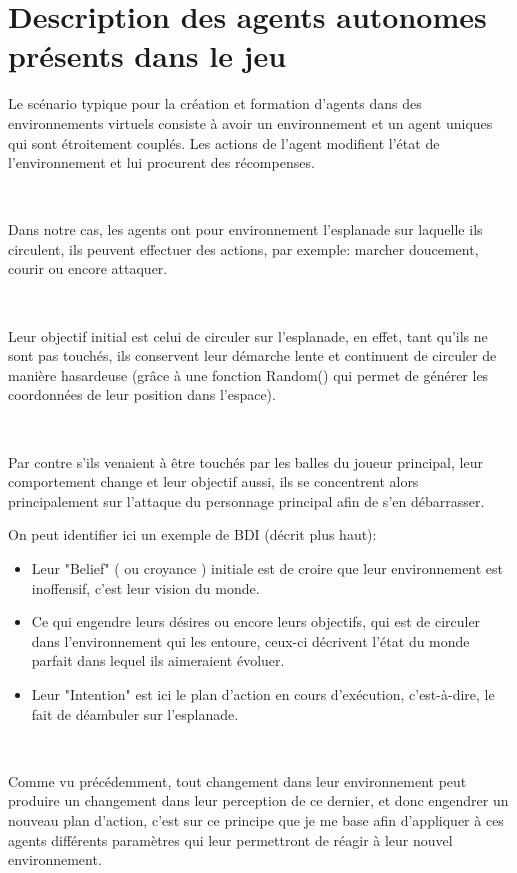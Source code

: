 \section{Description des agents autonomes présents dans le jeu}

Le scénario typique pour la création et formation d’agents dans des environnements virtuels consiste à avoir un environnement et un agent uniques qui sont étroitement couplés. Les actions de l'agent modifient l'état de l'environnement et lui procurent des récompenses. \parencite{unity2}  

~\par
Dans notre cas, les agents ont pour environnement l’esplanade sur laquelle ils circulent, ils peuvent effectuer des actions, par exemple:  marcher doucement, courir ou encore attaquer.
 
 
~\par 
Leur objectif initial est celui de circuler sur l'esplanade, en effet, tant qu’ils ne sont pas touchés, ils conservent leur démarche lente et continuent de circuler de manière hasardeuse (grâce à une fonction Random() qui permet de générer les coordonnées de leur position dans l’espace).

~\par
Par contre s'ils venaient à être touchés par les balles du joueur principal, leur comportement change et leur objectif aussi, ils se concentrent alors principalement sur l’attaque du personnage principal afin de s’en débarrasser.

On peut identifier ici un exemple de BDI (décrit plus haut): 

\begin{itemize}
\item Leur "Belief" ( ou croyance ) initiale est de croire que leur environnement est inoffensif, c’est leur vision du monde.
\item Ce qui engendre leurs désires ou encore leurs objectifs, qui est de circuler dans l’environnement qui les entoure, ceux-ci décrivent l'état du monde parfait dans lequel ils aimeraient évoluer.
\item Leur "Intention" est ici le plan d’action en cours d'exécution, c’est-à-dire, le fait de déambuler sur l’esplanade.
\end{itemize}


~\par
Comme vu précédemment, tout changement dans leur environnement peut produire un changement dans leur perception de ce dernier, et donc engendrer un nouveau plan d’action, c’est sur ce principe que je me base afin d’appliquer à ces agents différents paramètres qui leur permettront de réagir à leur nouvel environnement. 

